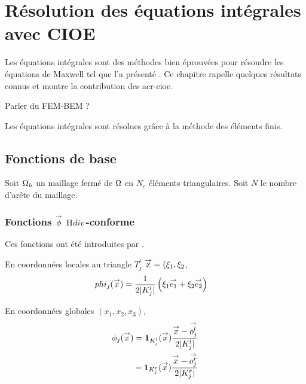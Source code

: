 \section{Résolution des équations intégrales avec CIOE}
  Les équations intégrales sont des méthodes bien éprouvées pour résoudre les équations de Maxwell tel que l'a présenté \cite{nedelec_acoustic_2001}. Ce chapitre  rapelle quelques résultats connus et montre la contribution des \gls{acr-cioe}.

  \begin{TODO} 
    Parler du FEM-BEM ?
  \end{TODO}

  Les équations intégrales sont résolues grâce à la méthode des éléments finis.

  \subsection{Fonctions de base}
    Soit \(\OO_h\) un maillage fermé de \(\OO\) en \(N_e\) éléments triangulaires. Soit \(N\) le nombre d'arête du maillage.

    \newcommand{\ncouche}{8}
    \newcommand{\xa}{-3}
    \newcommand{\ya}{0.5}
    \newcommand{\xb}{-0.5}
    \newcommand{\yb}{-2}
    \newcommand{\xc}{0.5}
    \newcommand{\yc}{2.5}
    \newcommand{\xd}{5}
    \newcommand{\yd}{-0.5}

    \subsubsection[Fonctions phi Hdiv-conforme]{Fonctions \(\vect{\phi}\) \(\Hdiv\)-conforme}

      Ces fonctions ont été introduites par \cite[eq.~6]{rao_electromagnetic_1982}.
    \begin{minipage}{0.58\textwidth}
      \begin{center}
        \begin{tikzpicture}[scale=1]
          
        \end{tikzpicture}
      \end{center}
    \end{minipage} 
    \begin{minipage}{0.4\textwidth}
      En coordonnées locales au triangle \(T_j^l\) \(\vx = (\xi_1,\xi_2\),
      \begin{align*}
        phi_j(\vx) &= \frac{1}{2|K_j^l|}\left(\xi_1 \vect{e_1} + \xi_2 \vect{e_2}\right)
      \end{align*}

      En coordonnées globales  \((x_1,x_2,x_3)\),
      \begin{align*}
        \phi_j(\vx) &= \mathbf{1}_{K_j^l}(\vx)\frac{\vx-\vect{o_j^l}}{2|K_j^l|} \\&- \mathbf{1}_{K_j^r}(\vx)\frac{\vx-\vect{o_j^r}}{2|K_j^r|}
      \end{align*}
    \end{minipage}

